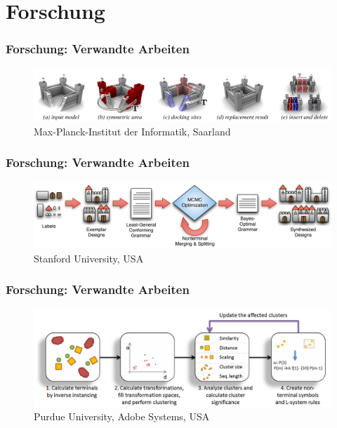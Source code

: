 \documentclass[12pt]{beamer}
\begin{document}
    \section{Forschung}
    \label{sec:forschung}
    \begin{frame}
        \frametitle{Forschung: Verwandte Arbeiten}

        \begin{figure}
            \centering
            \includegraphics[width=12cm]{../images/bokeloh_2010_system.PNG}
            \caption{Max-Planck-Institut der Informatik, Saarland~\cite{ref_1}}
        \end{figure}
    \end{frame}

    \begin{frame}
        \frametitle{Forschung: Verwandte Arbeiten}

        \begin{figure}
            \centering
            \includegraphics[width=12cm]{../images/talton_2012_system.PNG}
            \caption{Stanford University, USA~\cite{ref_2}}
        \end{figure}
    \end{frame}

    \begin{frame}
        \frametitle{Forschung: Verwandte Arbeiten}

        \begin{figure}
            \centering
            \includegraphics[width=12cm]{../images/stava_2010_system.PNG}
            \caption{Purdue University, Adobe Systems, USA~\cite{ref_3}}
        \end{figure}
    \end{frame}
\end{document}
